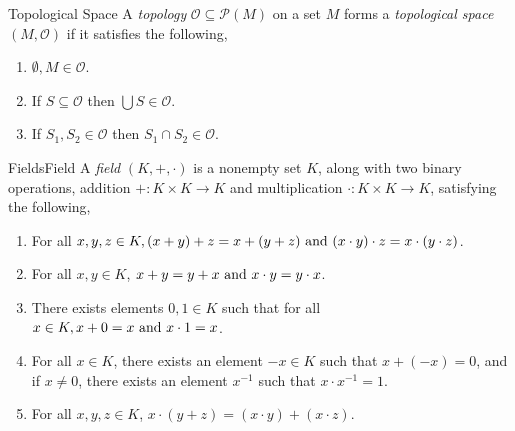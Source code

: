 \documentclass{article}
\newcommand{\tp}{\mathcal{O}}
\newcommand{\pset}[1]{\mathcal{P}(#1)}
\begin{document}
\begin{definition}{Topological Space}{}
    A \emph{topology} $\tp \subseteq \pset{M}$ on a set $M$ forms a \emph{topological space} $(M, \tp)$ if it satisfies the following,

    \begin{enumerate}[label=(\roman*)]
        \item $\emptyset, M \in \tp$.
        \item If $S \subseteq \tp$ then $\bigcup S \in \tp$.
        \item If $S_1, S_2 \in \tp$ then $S_1 \cap S_2 \in \tp$.
    \end{enumerate}
\end{definition}

\begin{definition}{Fields}{Field}
    A \emph{field} $\left(K, +, \cdot\right)$ is a nonempty set $K$, along with two binary operations,
    addition $+: K \times K \to K$
    and multiplication $\cdot: K \times K \to K$,
    satisfying the following,

    \begin{enumerate}[label=(\roman*)]
        \item  For all $x, y, z \in K, (x + y) + z = x + (y + z) \text{ and } (x \cdot y) \cdot z = x \cdot (y \cdot z)$.
        \item  For all $x, y \in K$, $x + y = y + x \text{ and } x \cdot y = y \cdot x$.
        \item  There exists elements $0, 1 \in K$ such that for all $x \in K, x + 0 = x \text{ and } x \cdot 1 = x$.
        \item  For all $x \in K$, there exists an element $-x \in K$ such that $x + (-x) = 0$, and if $x \neq 0$, there exists an element $x^{-1}$ such that $x \cdot x^{-1} = 1$.
        \item  For all $x, y, z \in K$, $x \cdot (y + z) = (x \cdot y) + (x \cdot z)$.
    \end{enumerate}
\end{definition}
\end{document}

